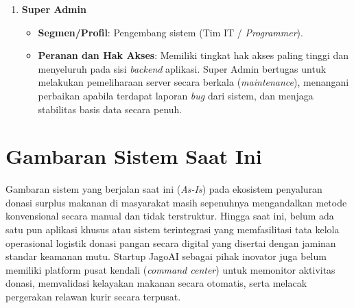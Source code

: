 \begin{enumerate}
\begin{itemize}
        \item \textbf{Peranan dan Hak Akses}: Memiliki hak akses dashboard admin untuk memverifikasi keabsahan pendaftaran akun baru secara manual, membekukan atau memblokir akun yang terbukti melakukan penyalahgunaan, menindaklanjuti laporan negatif, serta memantau Dasbor Statistik makro yang menampilkan peta panas (\textit{heatmap}) sebaran wilayah donasi dan kalkulasi SROI keseluruhan.
    \end{itemize}
    \item \textbf{Super Admin}
    \begin{itemize}
        \item \textbf{Segmen/Profil}: Pengembang sistem (Tim IT / \textit{Programmer}).
        \item \textbf{Peranan dan Hak Akses}: Memiliki tingkat hak akses paling tinggi dan menyeluruh pada sisi \textit{backend} aplikasi. Super Admin bertugas untuk melakukan pemeliharaan server secara berkala (\textit{maintenance}), menangani perbaikan apabila terdapat laporan \textit{bug} dari sistem, dan menjaga stabilitas basis data secara penuh.
    \end{itemize}
\end{enumerate}

\newpage

\section{Gambaran Sistem Saat Ini}
Gambaran sistem yang berjalan saat ini (\textit{As-Is}) pada ekosistem penyaluran donasi surplus makanan di masyarakat masih sepenuhnya mengandalkan metode konvensional secara manual dan tidak terstruktur. Hingga saat ini, belum ada satu pun aplikasi khusus atau sistem terintegrasi yang memfasilitasi tata kelola operasional logistik donasi pangan secara digital yang disertai dengan jaminan standar keamanan mutu. Startup JagoAI sebagai pihak inovator juga belum memiliki platform pusat kendali (\textit{command center}) untuk memonitor aktivitas donasi, memvalidasi kelayakan makanan secara otomatis, serta melacak pergerakan relawan kurir secara terpusat.

